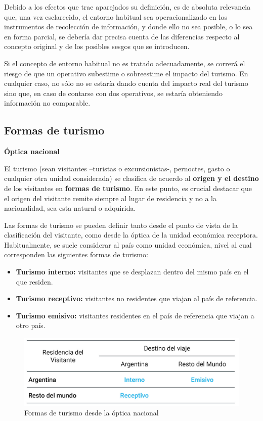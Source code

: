 \documentclass[
  openany]{book}
\begin{document}
Debido a los efectos que trae aparejados su definición, es de absoluta relevancia que, una vez esclarecido, el entorno habitual sea operacionalizado en los instrumentos de recolección de información, y donde ello no sea posible, o lo sea en forma parcial, se debería dar precisa cuenta de las diferencias respecto al concepto original y de los posibles sesgos que se introducen.

Si el concepto de entorno habitual no es tratado adecuadamente, se correrá el riesgo de que un operativo subestime o sobreestime el impacto del turismo. En cualquier caso, no sólo no se estaría dando cuenta del impacto real del turismo sino que, en caso de contarse con dos operativos, se estaría obteniendo información no comparable.

\hypertarget{formas-de-turismo}{%
\subsection{Formas de turismo}\label{formas-de-turismo}}

\textbf{Óptica nacional}

El turismo (sean visitantes --turistas o excursionistas-, pernoctes, gasto o cualquier otra unidad considerada) se clasifica de acuerdo al \textbf{origen y el destino} de los visitantes en \textbf{formas de turismo}. En este punto, es crucial destacar que el origen del visitante remite siempre al lugar de residencia y no a la nacionalidad, sea esta natural o adquirida.

Las formas de turismo se pueden definir tanto desde el punto de vista de la clasificación del visitante, como desde la óptica de la unidad económica receptora. Habitualmente, se suele considerar al país como unidad económica, nivel al cual corresponden las siguientes formas de turismo:

\begin{itemize}
\item
  \textbf{Turismo interno:} visitantes que se desplazan dentro del mismo país en el que residen.
\item
  \textbf{Turismo receptivo:} visitantes no residentes que viajan al país de referencia.
\item
  \textbf{Turismo emisivo:} visitantes residentes en el país de referencia que viajan a otro país.
\end{itemize}

\begin{figure}

{\centering \includegraphics[width=0.8\linewidth]{imagenes/figura1.3} 

}

\caption{Formas de turismo desde la óptica nacional}\label{fig:nacional}
\end{figure}
\end{document}
